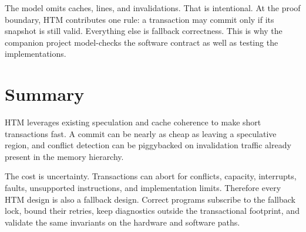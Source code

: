 The model omits caches, lines, and invalidations. That is intentional. At the proof boundary, HTM contributes one rule: a transaction may commit only if its snapshot is still valid. Everything else is fallback correctness. This is why the companion project model-checks the software contract as well as testing the implementations.

\section{Summary}

HTM leverages existing speculation and cache coherence to make short transactions fast. A commit can be nearly as cheap as leaving a speculative region, and conflict detection can be piggybacked on invalidation traffic already present in the memory hierarchy.

The cost is uncertainty. Transactions can abort for conflicts, capacity, interrupts, faults, unsupported instructions, and implementation limits. Therefore every HTM design is also a fallback design. Correct programs subscribe to the fallback lock, bound their retries, keep diagnostics outside the transactional footprint, and validate the same invariants on the hardware and software paths.

